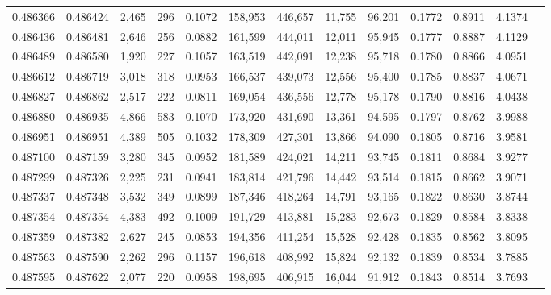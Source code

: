 \begin{tabular}{rrrrrrrrrrrrr}
0.486366 & 0.486424 &  2,465 &   296 &                                     0.1072 & 158,953 & 446,657 &  11,755 &  96,201 & 0.1772 & 0.8911 & 4.1374 \\
0.486436 & 0.486481 &  2,646 &   256 &                                     0.0882 & 161,599 & 444,011 &  12,011 &  95,945 & 0.1777 & 0.8887 & 4.1129 \\
0.486489 & 0.486580 &  1,920 &   227 &                                     0.1057 & 163,519 & 442,091 &  12,238 &  95,718 & 0.1780 & 0.8866 & 4.0951 \\
0.486612 & 0.486719 &  3,018 &   318 &                                     0.0953 & 166,537 & 439,073 &  12,556 &  95,400 & 0.1785 & 0.8837 & 4.0671 \\
0.486827 & 0.486862 &  2,517 &   222 &                                     0.0811 & 169,054 & 436,556 &  12,778 &  95,178 & 0.1790 & 0.8816 & 4.0438 \\
0.486880 & 0.486935 &  4,866 &   583 &                                     0.1070 & 173,920 & 431,690 &  13,361 &  94,595 & 0.1797 & 0.8762 & 3.9988 \\
0.486951 & 0.486951 &  4,389 &   505 &                                     0.1032 & 178,309 & 427,301 &  13,866 &  94,090 & 0.1805 & 0.8716 & 3.9581 \\
0.487100 & 0.487159 &  3,280 &   345 &                                     0.0952 & 181,589 & 424,021 &  14,211 &  93,745 & 0.1811 & 0.8684 & 3.9277 \\
0.487299 & 0.487326 &  2,225 &   231 &                                     0.0941 & 183,814 & 421,796 &  14,442 &  93,514 & 0.1815 & 0.8662 & 3.9071 \\
0.487337 & 0.487348 &  3,532 &   349 &                                     0.0899 & 187,346 & 418,264 &  14,791 &  93,165 & 0.1822 & 0.8630 & 3.8744 \\
0.487354 & 0.487354 &  4,383 &   492 &                                     0.1009 & 191,729 & 413,881 &  15,283 &  92,673 & 0.1829 & 0.8584 & 3.8338 \\
0.487359 & 0.487382 &  2,627 &   245 &                                     0.0853 & 194,356 & 411,254 &  15,528 &  92,428 & 0.1835 & 0.8562 & 3.8095 \\
0.487563 & 0.487590 &  2,262 &   296 &                                     0.1157 & 196,618 & 408,992 &  15,824 &  92,132 & 0.1839 & 0.8534 & 3.7885 \\
0.487595 & 0.487622 &  2,077 &   220 &                                     0.0958 & 198,695 & 406,915 &  16,044 &  91,912 & 0.1843 & 0.8514 & 3.7693 \\

\end{tabular}
